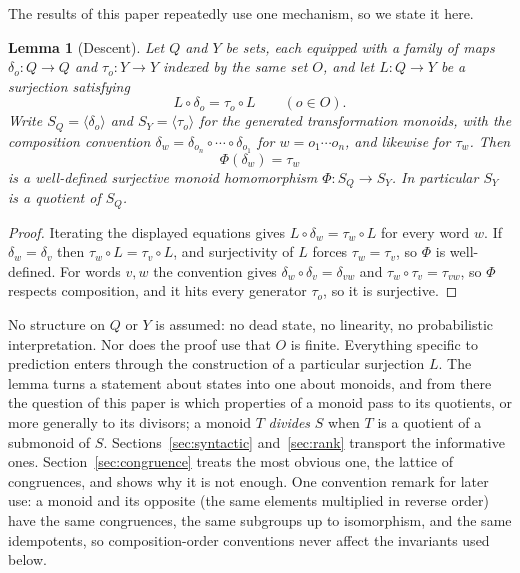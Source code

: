 \documentclass[10pt]{article}
\newtheorem{lemma}[theorem]{Lemma}
\theoremstyle{definition}
\theoremstyle{remark}
\newcommand{\Obs}{O}
\begin{document}
The results of this paper repeatedly use one mechanism, so we
state it here.

\begin{lemma}[Descent]
\label{lem:descent}
Let $Q$ and $Y$ be sets, each equipped with a family of maps
$\delta_o:Q\to Q$ and $\tau_o:Y\to Y$ indexed by the same set
$\Obs$, and let $L:Q\to Y$ be a surjection satisfying
\[
  L\circ\delta_o=\tau_o\circ L
  \qquad(o\in\Obs).
\]
Write $S_Q=\langle\delta_o\rangle$ and $S_Y=\langle\tau_o\rangle$ for the
generated transformation monoids, with the composition convention
$\delta_w=\delta_{o_n}\circ\cdots\circ\delta_{o_1}$ for
$w=o_1\cdots o_n$, and likewise for $\tau_w$.  Then
\[
  \Phi(\delta_w)=\tau_w
\]
is a well-defined surjective monoid homomorphism $\Phi:S_Q\to S_Y$.
In particular $S_Y$ is a quotient of $S_Q$.
\end{lemma}

\begin{proof}
Iterating the displayed equations gives $L\circ\delta_w=\tau_w\circ L$ for
every word $w$.  If $\delta_w=\delta_v$ then
$\tau_w\circ L=\tau_v\circ L$, and surjectivity of $L$ forces
$\tau_w=\tau_v$, so $\Phi$ is well-defined.  For words $v,w$ the convention
gives $\delta_w\circ\delta_v=\delta_{vw}$ and
$\tau_w\circ\tau_v=\tau_{vw}$, so $\Phi$ respects composition, and it hits
every generator $\tau_o$, so it is surjective.
\end{proof}

No structure on $Q$ or $Y$ is assumed: no dead state, no linearity, no
probabilistic interpretation.  Nor does the proof use that $\Obs$ is
finite.  Everything specific to prediction enters
through the construction of a particular surjection $L$.  The lemma
turns a statement about states into one about monoids, and from there
the question of this paper is which properties of a monoid pass to
its quotients, or more generally to its divisors; a monoid $T$
\emph{divides} $S$ when $T$ is a quotient of a submonoid of $S$.
Sections~\ref{sec:syntactic} and~\ref{sec:rank} transport the
informative ones.  Section~\ref{sec:congruence} treats the most
obvious one, the lattice of congruences, and shows why it is not
enough.  One convention remark for later use: a monoid and its
opposite (the same elements multiplied in reverse order) have the
same congruences, the same subgroups up to isomorphism, and the same
idempotents, so composition-order conventions never affect the
invariants used below.
\end{document}
